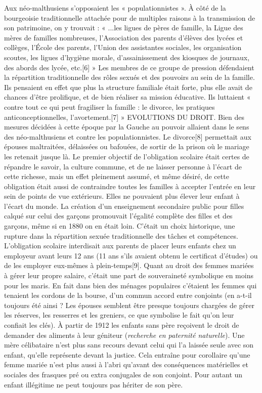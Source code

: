  Aux néo-malthusiens s'opposaient les « populationnistes ». À côté de la bourgeoisie traditionnelle attachée pour de multiples raisons à la transmission de son patrimoine, on y trouvait : « ...les ligues de pères de famille, la Ligue des mères de familles nombreuses, l'Association des parents d'élèves des lycées et collèges, l'École des parents, l'Union des assistantes sociales, les organisation scoutes, les ligues d'hygiène morale, d'assainissement des kiosques de journaux, des abords des lycée, etc.[6] » Les membres de ce groupe de pression défendaient la répartition traditionnelle des rôles sexués et des pouvoirs au sein de la famille. Ils pensaient en effet que plus la structure familiale était forte, plus elle avait de chances d'être prolifique, et de bien réaliser sa mission éducative. Ils luttaient « contre tout ce qui peut fragiliser la famille : le divorce, les pratiques anticonceptionnelles, l'avortement.[7] »
EVOLUTIONS DU DROIT.
 Bien des mesures décidées à cette époque par la Gauche au pouvoir allaient dans le sens des néo-malthusiens et contre les populationnistes. Le divorce[8] permettait aux épouses maltraitées, délaissées ou bafouées, de sortir de la prison où le mariage les retenait jusque là. 
 Le premier objectif de l'obligation scolaire était certes de répandre le savoir, la culture commune, et de ne laisser personne à l'écart de cette richesse, mais un effet pleinement assumé, et même désiré, de cette obligation était aussi de contraindre toutes les familles à accepter l'entrée en leur sein de points de vue extérieurs. Elles ne pouvaient plus élever leur enfant à l'écart du monde. 
 La création d'un enseignement secondaire public pour filles calqué sur celui des garçons promouvait l'égalité complète des filles et des garçons, même si en 1880 on en était loin. C'était un choix historique, une rupture dans la répartition sexuée traditionnelle des tâches et compétences. 
 L'obligation scolaire interdisait aux parents de placer leurs enfants chez un employeur avant leurs 12 ans (11 ans s'ils avaient obtenu le certificat d'études) ou de les employer eux-mêmes à plein-temps[9]. 
 Quant au droit des femmes mariées à gérer leur propre salaire, c'était une part de souveraineté symbolique en moins pour les maris. En fait dans bien des ménages populaires c'étaient les femmes qui tenaient les cordons de la bourse, d'un commun accord entre conjoints (en a-t-il toujours été ainsi ? Les épouses semblent être presque toujours chargées de gérer les réserves, les resserres et les greniers, ce que symbolise le fait qu'on leur confiait les clés).
 À partir de 1912 les enfants sans père reçoivent le droit de demander des aliments à leur géniteur (\emph{recherche en paternité naturelle}). Une mère célibataire n'est plus sans recours devant celui qui l'a laissée seule avec son enfant, qu'elle représente devant la justice. Cela entraîne pour corollaire qu'une femme mariée n'est plus aussi à l'abri qu'avant des conséquences matérielles et sociales des frasques pré ou extra conjugales de son conjoint. Pour autant un enfant illégitime ne peut toujours pas hériter de son père. 
